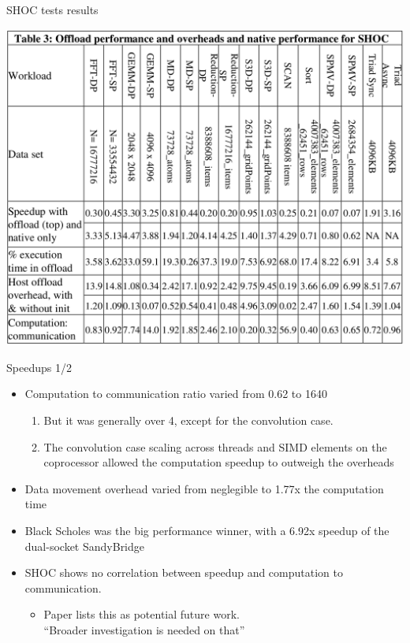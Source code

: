 \documentclass[screen]{beamer}
\begin{document}
\begin{frame}{SHOC tests results}
    \begin{center}
        \includegraphics[width=0.6\linewidth]{table3.png}
    \end{center}
\end{frame}

\begin{frame}{Speedups 1/2}
    \begin{itemize}[<+-| alert@+>]
        \item Computation to communication ratio varied from 0.62 to 1640
        \begin{enumerate}[<+-| alert@+>]
            \item But it was generally over 4, except for the convolution case.
            \item The convolution case scaling across threads and SIMD elements on the coprocessor allowed the computation speedup to outweigh the overheads
        \end{enumerate}
        \item Data movement overhead varied from neglegible to 1.77x the computation time
        \item Black Scholes was the big performance winner, with a 6.92x speedup of the dual-socket SandyBridge
        \item SHOC shows no correlation between speedup and computation to communication.
        \begin{itemize}
            \item Paper lists this as potential future work. \\
                ``Broader investigation is needed on that''
        \end{itemize}
    \end{itemize}
\end{frame}
\end{document}
